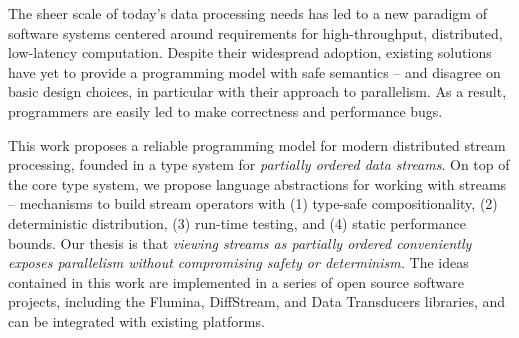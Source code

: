 The sheer scale of today's data processing needs has led to a new paradigm of software systems centered around requirements for high-throughput, distributed, low-latency computation.
Despite their widespread adoption, existing solutions have yet to provide a programming model with safe semantics -- and disagree on basic design choices, in particular with their approach to parallelism. As a result, \naive{} programmers are easily led to make correctness and performance bugs.

This work proposes a reliable programming model for modern distributed stream processing, founded in a type system for \emph{partially ordered data streams}. On top of the core type system, we propose language abstractions for working with streams -- mechanisms to build stream operators with (1) type-safe compositionality, (2) deterministic distribution, (3) run-time testing, and (4) static performance bounds. Our thesis is that \emph{viewing streams as partially ordered conveniently exposes parallelism without compromising safety or determinism.} The ideas contained in this work are implemented in a series of open source software projects, including the Flumina, DiffStream, and Data Transducers libraries, and can be integrated with existing platforms.
